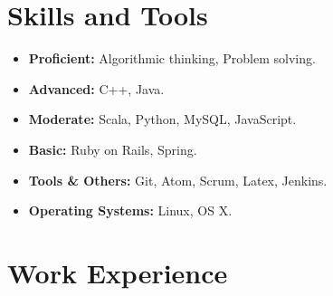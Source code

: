 \documentclass[a4paper,11pt]{article} %
\begin{document}

\section{Skills and Tools}
\begin{itemize}
 \item \textbf{Proficient:} Algorithmic thinking, Problem solving.
 \item \textbf{Advanced:} C++, Java.
 \item \textbf{Moderate:} Scala, Python, MySQL, JavaScript.
 \item \textbf{Basic:} Ruby on Rails, Spring.
 \item \textbf{Tools \& Others:} Git, Atom, Scrum, Latex, Jenkins.
 \item \textbf{Operating Systems:} Linux, OS X.
\end{itemize}



\section{Work Experience}
\end{document}
